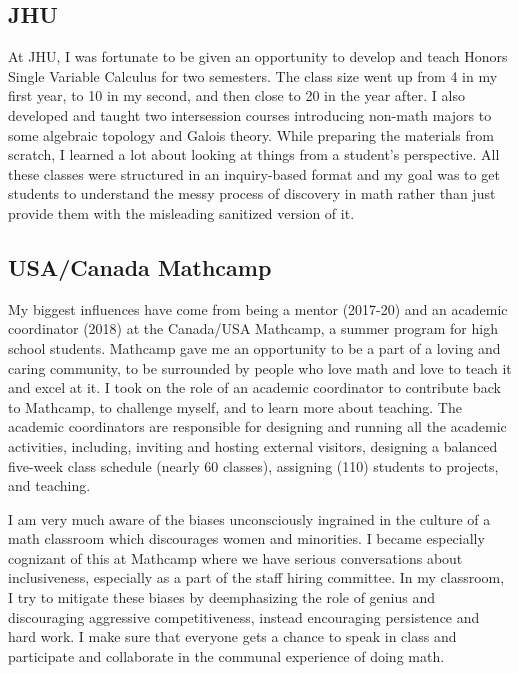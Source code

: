   
\subsection*{JHU}

  At JHU, I was fortunate to be given an opportunity to develop and teach Honors Single Variable Calculus for two semesters. 
  The class size went up from 4 in my first year, to 10 in my second, and then close to 20 in the year after. 
  I also developed and taught two intersession courses introducing non-math majors to some algebraic topology and Galois theory. 
  While preparing the materials from scratch, I learned a lot about looking at things from a student's perspective.
  All these classes were structured in an inquiry-based format and my goal was to get students to understand the messy process of discovery in math rather than just provide them with the misleading sanitized version of it.
  
  
  
  
  
  
  

\subsection*{USA/Canada Mathcamp}
  My biggest influences have come from being a mentor (2017-20) and an academic coordinator
  (2018) at the Canada/USA Mathcamp, a summer program for high school students.
  Mathcamp gave me an opportunity to be a part of a loving and caring community, to be surrounded by people who love math and love to teach it and excel at it.
  I took on the role of an academic coordinator to contribute back to Mathcamp, to challenge myself, and to learn more about teaching. 
  The academic coordinators are responsible for designing and running all the academic activities, including, inviting and hosting external visitors, designing a balanced five-week class schedule (nearly 60 classes), assigning (110) students to projects, and teaching. 

  I am very much aware of the biases unconsciously ingrained in the culture of a math classroom which discourages women and minorities. 
  I became especially cognizant of this at Mathcamp where we have serious conversations about inclusiveness, especially as a part of the staff hiring committee.
  In my classroom, I try to mitigate these biases by deemphasizing the role of genius and discouraging aggressive competitiveness, instead encouraging persistence and hard work. 
  I make sure that everyone gets a chance to speak in class and participate and collaborate in the communal experience of doing math.

